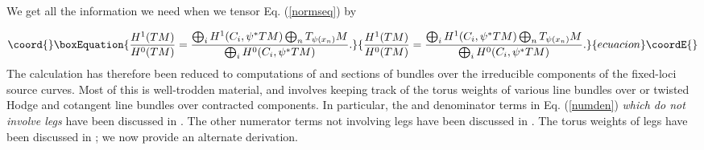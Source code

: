 \documentclass[a4paper,11pt]{article}
\providecommand{\PP}{{\mathbb{P}}}
\begin{document}
We get all the information we need when we tensor
Eq.\!\! (\ref{normseq}) by \coordHE{}

\begin{equation}\coord{}\boxEquation{
\label{honehzero}
\frac{H^1(TM)}{H^0(TM)} =
\frac{\bigoplus_i H^1(C_i,\psi^*TM)
\bigoplus_n T_{\psi(x_n)}M}{\bigoplus_i H^0(C_i,\psi^*TM)}.
}{
\frac{H^1(TM)}{H^0(TM)} =
\frac{\bigoplus_i H^1(C_i,\psi^*TM)
\bigoplus_n T_{\psi(x_n)}M}{\bigoplus_i H^0(C_i,\psi^*TM)}.
}{ecuacion}\coordE{}\end{equation}
The calculation has therefore been reduced to computations
of \coordHE{}  \coordHE{} and
sections of bundles
over the irreducible components of the fixed-loci
source curves.  Most of this is well-trodden material,
and involves keeping track of the torus weights
of various line bundles over \myHighlight{$\PP^1$}\coordHE{} or twisted
Hodge and cotangent line
bundles over contracted components.
In particular, the \coordHE{}  \coordHE{}
and denominator terms
in
Eq.\!\!\! (\ref{numden})
{\em which do not involve legs}
have been
discussed in \cite{GP}.
The other numerator terms not involving legs have
been discussed in \cite{KZ}.
The torus weights of legs
have been discussed in \cite{KL};
we now provide an alternate derivation.
\end{document}
